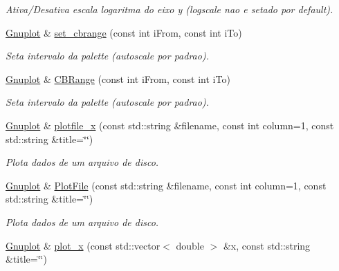 \begin{DoxyCompactItemize}
\begin{DoxyCompactList}\small\item\em Ativa/\-Desativa escala logaritma do eixo y (logscale nao e setado por default). \end{DoxyCompactList}\item 
\hypertarget{classGnuplot_a2c8c8ae0441f54dd728bc6594051c137}{\hyperlink{classGnuplot}{Gnuplot} \& \hyperlink{classGnuplot_a2c8c8ae0441f54dd728bc6594051c137}{set\-\_\-cbrange} (const int i\-From, const int i\-To)}\label{classGnuplot_a2c8c8ae0441f54dd728bc6594051c137}

\begin{DoxyCompactList}\small\item\em Seta intervalo da palette (autoscale por padrao). \end{DoxyCompactList}\item 
\hypertarget{classGnuplot_ab5b863b17dcc767214e472330bceedca}{\hyperlink{classGnuplot}{Gnuplot} \& \hyperlink{classGnuplot_ab5b863b17dcc767214e472330bceedca}{C\-B\-Range} (const int i\-From, const int i\-To)}\label{classGnuplot_ab5b863b17dcc767214e472330bceedca}

\begin{DoxyCompactList}\small\item\em Seta intervalo da palette (autoscale por padrao). \end{DoxyCompactList}\item 
\hypertarget{classGnuplot_a4ca35415fa5560764597cfdfa46c6c40}{\hyperlink{classGnuplot}{Gnuplot} \& \hyperlink{classGnuplot_a4ca35415fa5560764597cfdfa46c6c40}{plotfile\-\_\-x} (const std\-::string \&filename, const int column=1, const std\-::string \&title=\char`\"{}\char`\"{})}\label{classGnuplot_a4ca35415fa5560764597cfdfa46c6c40}

\begin{DoxyCompactList}\small\item\em Plota dados de um arquivo de disco. \end{DoxyCompactList}\item 
\hypertarget{classGnuplot_a12ba90a46e80421f655049cb1d1d835d}{\hyperlink{classGnuplot}{Gnuplot} \& \hyperlink{classGnuplot_a12ba90a46e80421f655049cb1d1d835d}{Plot\-File} (const std\-::string \&filename, const int column=1, const std\-::string \&title=\char`\"{}\char`\"{})}\label{classGnuplot_a12ba90a46e80421f655049cb1d1d835d}

\begin{DoxyCompactList}\small\item\em Plota dados de um arquivo de disco. \end{DoxyCompactList}\item 
\hypertarget{classGnuplot_a9400d43204b9df62851c063aee604f0d}{\hyperlink{classGnuplot}{Gnuplot} \& \hyperlink{classGnuplot_a9400d43204b9df62851c063aee604f0d}{plot\-\_\-x} (const std\-::vector$<$ double $>$ \&x, const std\-::string \&title=\char`\"{}\char`\"{})}\label{classGnuplot_a9400d43204b9df62851c063aee604f0d}


\end{DoxyCompactItemize}
